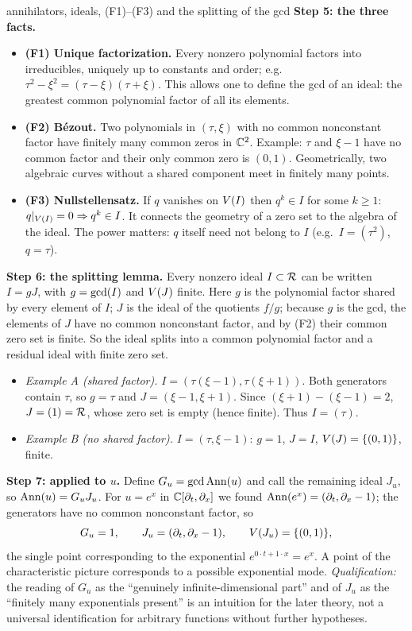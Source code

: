 \begin{explained}{annihilators, ideals, (F1)--(F3) and the splitting of the gcd}
\medskip\textbf{Step 5: the three facts.}
\begin{itemize}[nosep]
\item \textbf{(F1) Unique factorization.} Every nonzero polynomial factors into irreducibles, uniquely up to constants and order; e.g.\ $\tau^2-\xi^2=(\tau-\xi)(\tau+\xi)$. This allows one to define the gcd of an ideal: the greatest common polynomial factor of all its elements.
\item \textbf{(F2) B\'ezout.} Two polynomials in $(\tau,\xi)$ with no common nonconstant factor have finitely many common zeros in $\mathbb{C}^2$. Example: $\tau$ and $\xi-1$ have no common factor and their only common zero is $(0,1)$. Geometrically, two algebraic curves without a shared component meet in finitely many points.
\item \textbf{(F3) Nullstellensatz.} If $q$ vanishes on $V(I)$ then $q^k\in I$ for some $k\ge1$: $q|_{V(I)}=0\Rightarrow q^k\in I$. It connects the geometry of a zero set to the algebra of the ideal. The power matters: $q$ itself need not belong to $I$ (e.g.\ $I=(\tau^2)$, $q=\tau$).
\end{itemize}

\medskip\textbf{Step 6: the splitting lemma.} Every nonzero ideal $I\subset\mathcal{R}$ can be written $I=gJ$, with $g=\operatorname{gcd}(I)$ and $V(J)$ finite. Here $g$ is the polynomial factor shared by every element of $I$; $J$ is the ideal of the quotients $f/g$; because $g$ is the gcd, the elements of $J$ have no common nonconstant factor, and by (F2) their common zero set is finite. So the ideal splits into a common polynomial factor and a residual ideal with finite zero set.
\begin{itemize}[nosep]
\item \emph{Example A (shared factor).} $I=(\tau(\xi-1),\tau(\xi+1))$. Both generators contain $\tau$, so $g=\tau$ and $J=(\xi-1,\xi+1)$. Since $(\xi+1)-(\xi-1)=2$, $J=(1)=\mathcal{R}$, whose zero set is empty (hence finite). Thus $I=(\tau)$.
\item \emph{Example B (no shared factor).} $I=(\tau,\xi-1)$: $g=1$, $J=I$, $V(J)=\{(0,1)\}$, finite.
\end{itemize}

\medskip\textbf{Step 7: applied to $u$.} Define $G_u=\operatorname{gcd}\operatorname{Ann}(u)$ and call the remaining ideal $J_u$, so $\operatorname{Ann}(u)=G_uJ_u$. For $u=e^x$ in $\mathbb{C}[\partial_t,\partial_x]$ we found $\operatorname{Ann}(e^x)=(\partial_t,\partial_x-1)$; the generators have no common nonconstant factor, so
\[
G_u=1,\qquad J_u=(\partial_t,\partial_x-1),\qquad V(J_u)=\{(0,1)\},
\]
the single point corresponding to the exponential $e^{0\cdot t+1\cdot x}=e^x$. A point of the characteristic picture corresponds to a possible exponential mode. \emph{Qualification:} the reading of $G_u$ as the ``genuinely infinite-dimensional part'' and of $J_u$ as the ``finitely many exponentials present'' is an intuition for the later theory, not a universal identification for arbitrary functions without further hypotheses.
\end{explained}

